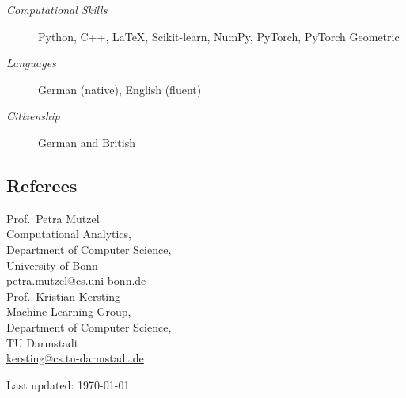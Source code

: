 \documentclass[11pt, a4paper]{scrartcl}
\begin{document}
\begin{description}
	\item[\em Computational Skills] Python, C\hspace{-1pt}+\hspace{-1pt}+, \LaTeX, Scikit-learn, NumPy, PyTorch, PyTorch Geometric
	\item[\em Languages] German (native), English (fluent)
	\item[\em Citizenship] German and British
\end{description}


\subsection*{Referees}
Prof.~Petra Mutzel\\
Computational Analytics,\\ 
Department of Computer Science,\\
University of Bonn \\
\href{mailto:petra.mutzel@cs.uni-bonn.de}{petra.mutzel@cs.uni-bonn.de}\\


Prof.~Kristian Kersting\\ 
Machine Learning Group,\\
Department of Computer Science,\\
TU Darmstadt\\
\href{mailto:kersting@cs.tu-darmstadt.de}{kersting@cs.tu-darmstadt.de}\\

\vfill{} 
\begin{center}
{\scriptsize Last updated: \today}
\end{center}
\end{document}

